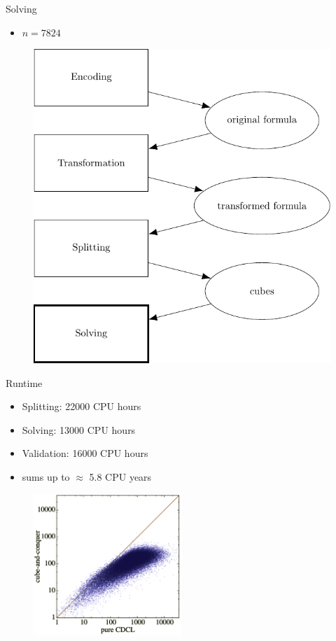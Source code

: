 \documentclass[c,8pt,xcolor...,x11names,usenames,dvipsnames]{beamer}
\begin{document}
\begin{frame}{Solving}
	\begin{itemize}
		\item $n = 7824$
	\end{itemize}
	\begin{figure}
		\includegraphics[scale=0.6]{images/framework4}
	\end{figure}
\end{frame}


\begin{frame}{Runtime}
	\begin{itemize}
		\item Splitting: 22000 CPU hours 
		\item Solving: 13000 CPU hours 
		\item Validation: 16000 CPU hours 
		\item sums up to $\approx$ 5.8 CPU years
	\end{itemize}
	\pause
	\begin{figure}
		\includegraphics[width=0.5\textwidth]{images/plot1.png} 
	\end{figure}
\end{frame}
\end{document}
